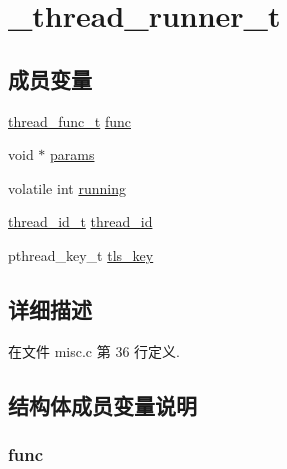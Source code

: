 \hypertarget{struct__thread__runner__t}{}\section{\+\_\+thread\+\_\+runner\+\_\+t}
\label{struct__thread__runner__t}
\subsection*{成员变量}
\begin{DoxyCompactItemize}
\item 
\hyperlink{config_8h_a46bcd8005e5d86fdbc6be5af0a77156c}{thread\+\_\+func\+\_\+t} \hyperlink{struct__thread__runner__t_afe63ba6c3b7e8fbc14263ff110724c7b}{func}
\item 
void $\ast$ \hyperlink{struct__thread__runner__t_a2aec9f694830e518722ab4bc4e275527}{params}
\item 
volatile int \hyperlink{struct__thread__runner__t_af1f449cc09f8d36befcce07bc38c29c0}{running}
\item 
\hyperlink{config_8h_ad0ada5642d10ce71bdd90816182f9b79}{thread\+\_\+id\+\_\+t} \hyperlink{struct__thread__runner__t_a14d64ca2cf0317cc7821972647eb7b7a}{thread\+\_\+id}
\item 
pthread\+\_\+key\+\_\+t \hyperlink{struct__thread__runner__t_a2ea447b43466d6b07a2b6af1b41a90fa}{tls\+\_\+key}
\end{DoxyCompactItemize}


\subsection{详细描述}


在文件 misc.\+c 第 36 行定义.



\subsection{结构体成员变量说明}
\hypertarget{struct__thread__runner__t_afe63ba6c3b7e8fbc14263ff110724c7b}{}
\subsubsection[{func}]{ func}\label{struct__thread__runner__t_afe63ba6c3b7e8fbc14263ff110724c7b}


